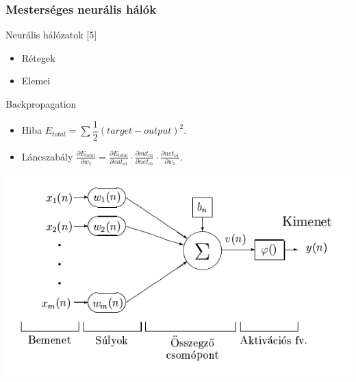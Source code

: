 \documentclass{beamer}
\begin{document}
\begin{frame}[fragile]
\frametitle{Mesterséges neurális hálók}

Neurális hálózatok [5]
\begin{itemize}
\item Rétegek
\item Elemei
\end{itemize}

Backpropagation
\begin{itemize}
\item Hiba $E_{total} = \sum \dfrac{1}{2}(target - output)^2.$
\item Láncszabály $\frac{\partial E_{total}}{\partial w_{5}} = \frac{\partial E_{total}}{\partial out_{o1}} \cdot \frac{\partial out_{o1}}{\partial net_{o1}} \cdot \frac{\partial net_{o1}}{\partial w_{5}}.$
\end{itemize}

\includegraphics[scale=0.4, center]{ANNParts}

\end{frame}
\end{document}
